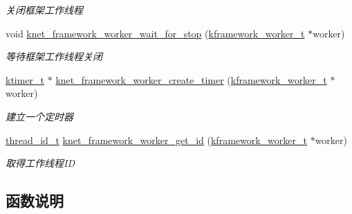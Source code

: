 \begin{DoxyCompactItemize}
\begin{DoxyCompactList}\small\item\em 关闭框架工作线程 \end{DoxyCompactList}\item 
void \hyperlink{a00064_a74b264bfdb937045c6e1d72e12603403_a74b264bfdb937045c6e1d72e12603403}{knet\+\_\+framework\+\_\+worker\+\_\+wait\+\_\+for\+\_\+stop} (\hyperlink{a00054_af2a7f5b8406de73682f8bd4c2afee783_af2a7f5b8406de73682f8bd4c2afee783}{kframework\+\_\+worker\+\_\+t} $\ast$worker)
\begin{DoxyCompactList}\small\item\em 等待框架工作线程关闭 \end{DoxyCompactList}\item 
\hyperlink{a00054_a846172ea4e8a86449eca41a3d8e074b7_a846172ea4e8a86449eca41a3d8e074b7}{ktimer\+\_\+t} $\ast$ \hyperlink{a00064_a0599b3e991b6545e3070aa8414b9c0f3_a0599b3e991b6545e3070aa8414b9c0f3}{knet\+\_\+framework\+\_\+worker\+\_\+create\+\_\+timer} (\hyperlink{a00054_af2a7f5b8406de73682f8bd4c2afee783_af2a7f5b8406de73682f8bd4c2afee783}{kframework\+\_\+worker\+\_\+t} $\ast$worker)
\begin{DoxyCompactList}\small\item\em 建立一个定时器 \end{DoxyCompactList}\item 
\hyperlink{a00054_ad0ada5642d10ce71bdd90816182f9b79_ad0ada5642d10ce71bdd90816182f9b79}{thread\+\_\+id\+\_\+t} \hyperlink{a00064_a9697af110fe414bbf4031b3e06528b02_a9697af110fe414bbf4031b3e06528b02}{knet\+\_\+framework\+\_\+worker\+\_\+get\+\_\+id} (\hyperlink{a00054_af2a7f5b8406de73682f8bd4c2afee783_af2a7f5b8406de73682f8bd4c2afee783}{kframework\+\_\+worker\+\_\+t} $\ast$worker)
\begin{DoxyCompactList}\small\item\em 取得工作线程\+I\+D \end{DoxyCompactList}\end{DoxyCompactItemize}


\subsection{函数说明}
\hypertarget{a00064_a032b3c34db5de1a62a8bcf5ca9ebe1f8_a032b3c34db5de1a62a8bcf5ca9ebe1f8}{}
